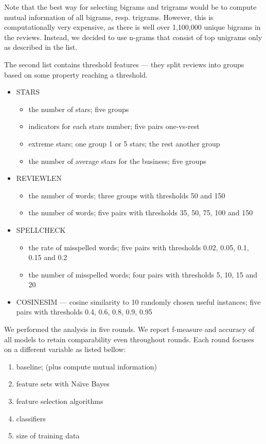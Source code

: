 Note that the best way for selecting bigrams and trigrams would be to compute mutual information of all bigrams, resp. trigrams.
However, this is computationally very expensive, as there is well over 1,100,000 unique bigrams in the reviews.
Instead, we decided to use n-grams that consist of top unigrams only as described in the list.

The second list contains threshold features --- they split reviews into groups based on some property reaching a threshold.

\begin{itemize}
	\item STARS 
		\begin{itemize}
			\item the number of stars; five groups
			\item indicators for each stars number; five pairs one-vs-rest
			\item extreme stars; one group 1 or 5 stars; the rest another group
			\item the number of average stars for the business; five groups
		\end{itemize}
	\item REVIEWLEN 
		\begin{itemize}
			\item the number of words; three groups with thresholds 50 and 150
			\item the number of words; five pairs with thresholds 35, 50, 75, 100 and 150
		\end{itemize}
	\item SPELLCHECK 
		\begin{itemize}
			\item the rate of misspelled words; five pairs with thresholds 0.02, 0.05, 0.1, 0.15 and 0.2
			\item the number of misspelled words; four pairs with thresholds 5, 10, 15 and 20
		\end{itemize}
	
	\item COSINESIM --- cosine similarity to 10 randomly chosen useful instances; five pairs with thresholds 0.4, 0.6, 0.8, 0.9, 0.95
\end{itemize}

We performed the analysis in five rounds.
We report f-measure and accuracy of all models to retain comparability even throughout rounds.
Each round focuses on a different variable as listed bellow:

\begin{enumerate}
	\item baseline; (plus compute mutual information)
	\item feature sets with Na\"{\i}ve Bayes
	\item feature selection algorithms
	\item classifiers
	\item size of training data
\end{enumerate}


